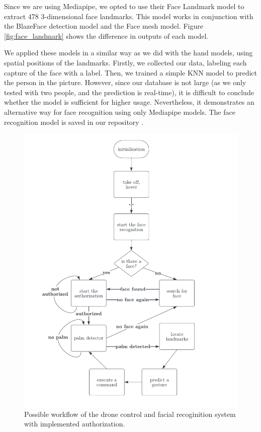 Since we are using Mediapipe, we opted to use their Face Landmark model to extract 478 3-dimensional face landmarks. This model works in conjunction with the BlazeFace detection model and the Face mesh model. Figure \ref{fig:face_landmark} shows the difference in outputs of each model.

We applied these models in a similar way as we did with the hand models, using spatial positions of the landmarks. Firstly, we collected our data, labeling each capture of the face with a label. Then, we trained a simple KNN model to predict the person in the picture. However, since our database is not large (as we only tested with two people, and the prediction is real-time), it is difficult to conclude whether the model is sufficient for higher usage. Nevertheless, it demonstrates an alternative way for face recognition using only Mediapipe models. The face recognition model is saved in our repository \cite{touchlessdronecontrol}.

\clearpage




\begin{figure}[ht!]
	\centering
	\includegraphics[width=\textwidth]{images/flowchart2.pdf}
	\caption{Possible workflow of the drone control and facial recoginition system with implemented authorization.}
	\label{fig:flowchart2.pdf}
\end{figure}

